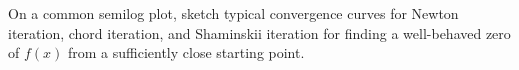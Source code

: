 \documentclass[12pt, leqno]{article}
\begin{document}

On a common semilog plot, sketch typical convergence curves for Newton
iteration, chord iteration, and Shaminskii iteration for finding a
well-behaved zero of $f(x)$ from a sufficiently close starting point.
\end{document}
